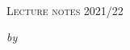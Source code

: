 \pagestyle{empty}

\begin{titlepage}
	\centering

	~

	\vspace{24pt}
	{\scshape\huge {\booktitle}\par}
	\vspace{6pt}
	{\scshape\large Lecture notes 2021/22\par}
	{\itshape by\par}
	\vspace{6pt}
	{\itshape\large \authorname\par}
	{\large {\sourcelink} }
\end{titlepage}
